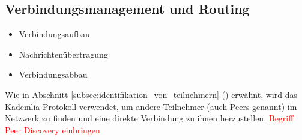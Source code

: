 \subsection{Verbindungsmanagement und Routing}
\label{subsec:routing}

\begin{itemize}
    \item Verbindungsaufbau
    \item Nachrichtenübertragung
    \item Verbindungsabbau
\end{itemize}

\noindent Wie in Abschnitt \ref{subsec:identifikation_von_teilnehmern} () erwähnt, wird das Kademlia-Protokoll verwendet, um andere Teilnehmer (auch Peers genannt) im Netzwerk zu finden und eine direkte Verbindung zu ihnen herzustellen. \textcolor{red}{Begriff Peer Discovery einbringen}


